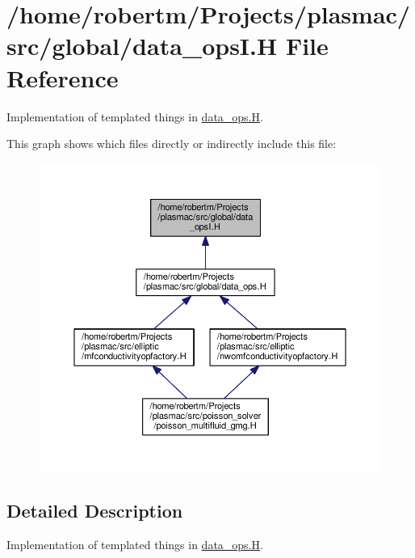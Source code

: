 \hypertarget{data__opsI_8H}{}\section{/home/robertm/\+Projects/plasmac/src/global/data\+\_\+opsI.H File Reference}
\label{data__opsI_8H}


Implementation of templated things in \hyperlink{data__ops_8H}{data\+\_\+ops.\+H}.  


This graph shows which files directly or indirectly include this file\+:\nopagebreak
\begin{figure}[H]
\begin{center}
\leavevmode
\includegraphics[width=350pt]{data__opsI_8H__dep__incl}
\end{center}
\end{figure}


\subsection{Detailed Description}
Implementation of templated things in \hyperlink{data__ops_8H}{data\+\_\+ops.\+H}. 

